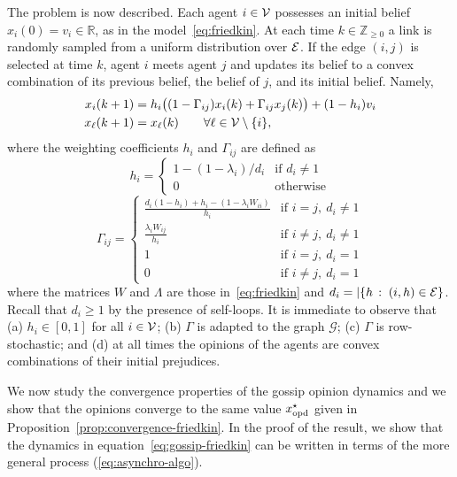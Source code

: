 \documentclass{IEEEtran}
\newcommand{\setdef}[2]{\{#1 \, : \; #2\}}
\newcommand{\real}{\mathbb{R}}
\newcommand{\integernonnegative}{\mathbb{Z}_{\ge 0}}
\newcommand{\1}{\mathbf{1}} \newcommand{\ind}{\mathds{1}}
\begin{document}
The problem is now described.
Each agent $i\in \mathcal{V} $ possesses an initial belief $x_i(0)=v_i\in \real$, as in the model~\eqref{eq:friedkin}. At each time $k\in\integernonnegative$ a link is randomly sampled from a uniform distribution over $\mathcal{E}$. If the edge $(i, j)$ is selected at time $k$, agent $i$ meets agent $j$ and updates its belief to a convex combination of its previous belief, the belief of $j$, and its initial belief. Namely, 
\begin{align}
\label{eq:gossip-friedkin}
\nonumber x_i(k+1)&=h_{i}\big((1-\Gamma_{ij})x_i(k)+\Gamma_{ij}x_j(k)\big)+(1-h_{i})v_i\\
x_\ell(k+1)&=x_\ell(k)\qquad \forall \ell\in \mathcal{V}\setminus\{i\},
\end{align}
where the weighting coefficients $h_i$ and $\Gamma_{ij}$ are defined as 
\begin{equation} 
\label{eqn:H}
 h_i=\begin{cases}
1-{(1-\lambda_{i})}/{d_i}&\text{if }d_i\neq1\\
{ 0}&\text{otherwise}
\end{cases}
\end{equation}
\begin{equation}\label{eqn:Gamma}
\Gamma_{ij}=\begin{cases}
\frac{d_i(1-h_i)+h_i-(1-\lambda_{i}W_{ii})}{h_i}&\text{if }i=j,\ d_i\neq1\\
\frac{\lambda_{i}W_{ij}}{h_i}&\text{if }i\neq j,\ d_i\neq 1\\
1&\text{if }i=j,\ d_i=1\\
0&\text{if }i\neq j,\ d_i=1
\end{cases}
\end{equation}
where the matrices $W$ and $\Lambda$ are those in~\eqref{eq:friedkin} and $d_i=|\setdef{h}{(i,h)\in \E}$. Recall that $d_i\ge1$ by the presence of self-loops. 
It is immediate to observe that
(a) $h_i\in [0,1]$ for all $i\in \mathcal{V}$; (b) $\Gamma$ is adapted to the graph $\mathcal{G}$;
(c) $\Gamma$ is row-stochastic; and (d) at all times the opinions of the agents are convex combinations of their initial prejudices.

We now study the convergence properties of the gossip opinion dynamics and we show that the opinions converge to the same value ${x_{\textup{opd}}^{\star}}$ given in Proposition~\ref{prop:convergence-friedkin}. 
In the proof of the result, we show that the dynamics in equation~\eqref{eq:gossip-friedkin}
can be written in terms of the more general process (\ref{eq:asynchro-algo}).
\end{document}
